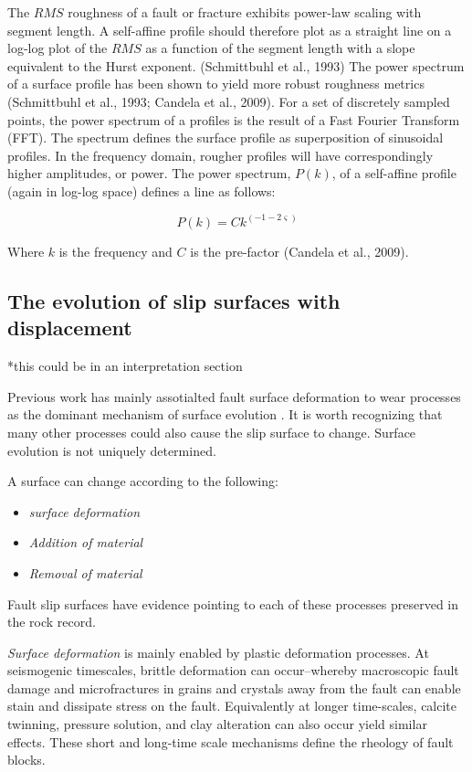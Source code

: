 \documentclass[12pt,a4paper]{article}
\begin{document}
	The $RMS$ roughness of a fault or fracture exhibits power-law scaling with segment length. A self-affine profile should therefore plot as a straight line on a log-log plot of the $RMS$ as a function of the segment length with a slope equivalent to the Hurst exponent. (Schmittbuhl et al., 1993)
The power spectrum of a surface profile has been shown to yield more robust roughness metrics (Schmittbuhl et al., 1993; Candela et al., 2009). For a set of discretely sampled points, the power spectrum of a profiles is the result of a Fast Fourier Transform (FFT). The spectrum defines the surface profile as superposition of sinusoidal profiles.   In the frequency domain, rougher profiles will have correspondingly higher amplitudes, or power. The power spectrum, $P(k)$, of a self-affine profile (again in log-log space) defines a line as follows:

\begin{equation}
P(k) = Ck^{(-1-2\varsigma)}
\end{equation}

Where $k$ is the frequency and $C$ is the pre-factor (Candela et al., 2009). 

\subsection{The evolution of slip surfaces with displacement}

*this could be in an interpretation section

Previous work has mainly assotialted fault surface deformation to wear processes as the dominant mechanism of surface evolution \cite{power1988roughness} \cite{sagy2009geometric} \cite{brodsky2011faults}. It is worth recognizing that many other processes could also cause the slip surface to change. Surface evolution is not uniquely determined.

A surface can change according to the following:

\begin{itemize}
	\item[] \textit{surface deformation}
	\item[] \textit{Addition of material}
	\item[] \textit{Removal of material}
\end{itemize}

Fault slip surfaces have evidence pointing to each of these processes preserved in the rock record.

\textit{Surface deformation} is mainly enabled by plastic deformation processes. At seismogenic timescales, brittle deformation can occur--whereby macroscopic fault damage and microfractures in grains and crystals away from the fault can enable stain and dissipate stress on the fault. Equivalently at longer time-scales, calcite twinning, pressure solution, and clay alteration can also occur yield similar effects. These short and long-time scale mechanisms define the rheology of fault blocks. 
\end{document}
